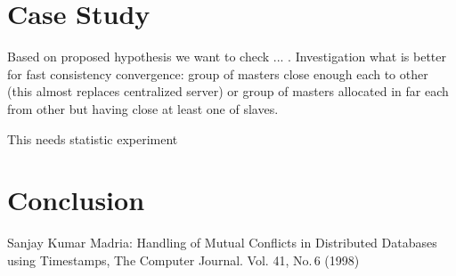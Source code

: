 \documentclass{llncs}
\begin{document}
\section{Case Study}\label{sec:experiments}
Based on proposed hypothesis we want to check ... .
Investigation what is better for fast consistency convergence:
group of masters close enough each to other (this almost replaces centralized server)
or group of masters allocated in far each from other but having close at least one of slaves.

This needs statistic experiment

\section{Conclusion}

\begin{thebibliography}{99}

Sanjay Kumar Madria: 
Handling of Mutual Conflicts in Distributed Databases using Timestamps,
The Computer Journal. Vol. 41, No.\,6 (1998) 

\end{thebibliography}
\end{document}
